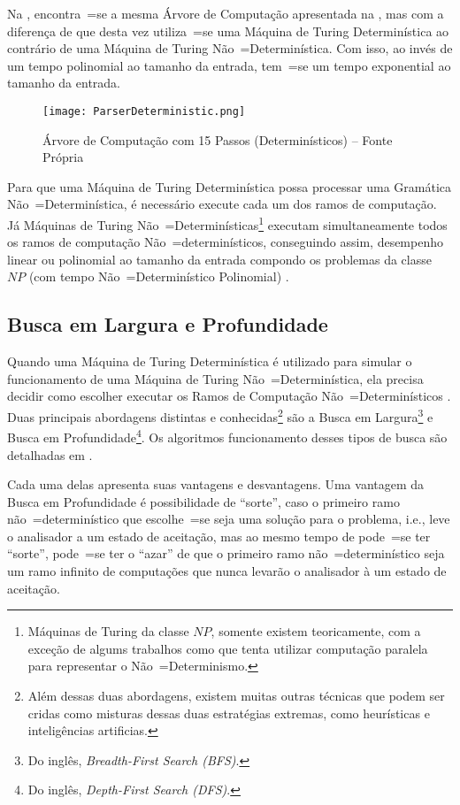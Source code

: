 Na ,
encontra~=se a mesma Árvore de Computação apresentada na ,
mas com a diferença de que desta vez utiliza~=se uma Máquina de Turing Determinística ao contrário de uma Máquina de Turing Não~=Determinística.
Com isso,
ao invés de um tempo polinomial ao tamanho da entrada,
tem~=se um tempo exponential ao tamanho da entrada.
\begin{figure}[h]
\centering
\texttt{[image: ParserDeterministic.png]}
\caption[Árvore de Computação com 15 Passos (Determinísticos)]{Árvore de Computação com 15 Passos (Determinísticos) -- Fonte Própria}
\label{ParserDeterministic}
\end{figure}

Para que uma Máquina de Turing Determinística possa processar uma Gramática Não~=Determinística,
é necessário execute cada um dos ramos de computação.
Já Máquinas de Turing Não~=Determinísticas\footnote{
Máquinas de Turing da classe $NP$,
somente existem teoricamente,
com a exceção de algums trabalhos como  que tenta utilizar computação paralela para representar o Não~=Determinismo.
}
executam simultaneamente todos os ramos de computação Não~=determinísticos,
conseguindo assim, desempenho linear ou
polinomial ao tamanho da entrada compondo os problemas da classe $NP$ (com tempo Não~=Determinístico Polinomial) \cite{hopcroftBook}.


\subsection{Busca em Largura e Profundidade}
\label{buscaEmLarguraEProfundidade}

Quando uma Máquina de Turing Determinística é utilizado para simular o funcionamento de uma Máquina de Turing Não~=Determinística,
ela precisa decidir como escolher executar os Ramos de Computação Não~=Determinísticos \cite{sipserBook}.
Duas principais abordagens distintas e
conhecidas\footnote{
Além dessas duas abordagens,
existem muitas outras técnicas que podem ser cridas como misturas dessas duas estratégias extremas,
como heurísticas e inteligências artificias.
}
são a Busca em Largura\footnote{
Do inglês, \textit{Breadth-First Search (BFS)}.
}
e Busca em Profundidade\footnote{
Do inglês, \textit{Depth-First Search (DFS)}.
}.
Os algoritmos funcionamento desses tipos de busca são detalhadas em .

Cada uma delas apresenta suas vantagens e
desvantagens.
Uma vantagem da Busca em Profundidade é possibilidade de ``sorte'',
caso o primeiro ramo não~=determinístico que escolhe~=se seja uma solução para o problema,
i.e.,
leve o analisador a um estado de aceitação,
mas ao mesmo tempo de pode~=se ter ``sorte'',
pode~=se ter o ``azar'' de que o primeiro ramo não~=determinístico seja um ramo infinito de computações que nunca levarão o analisador à um estado de aceitação.

